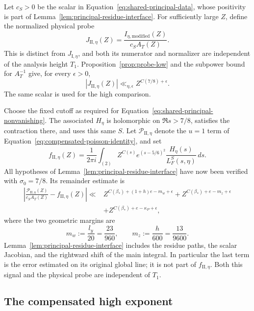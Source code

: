 \documentclass[11pt,a4paper]{article}
\numberwithin{equation}{section}
\numberwithin{figure}{section}
\theoremstyle{definition}
\theoremstyle{remark}
\begin{document}
Let \(c_S>0\) be the scalar in Equation~\eqref{eq:shared-principal-data},
whose positivity is part of Lemma~\ref{lem:principal-residue-interface}.
For sufficiently large \(Z\), define the normalized physical probe
\[
 J_{\mathrm{II},\eta}(Z)
   =\frac{I_{\eta,\mathrm{modified}}(Z)}{c_S A_T(Z)}.
\]
This is distinct from \(J_{\mathrm I,\eta}\), and both its numerator and
normalizer are independent of the analysis height \(T_1\).
Proposition~\ref{prop:probe-low} and the subpower bound for \(A_T^{-1}\)
give, for every \(\epsilon>0\),
\begin{equation}\label{eq:part-II-normalized-low}
 |J_{\mathrm{II},\eta}(Z)|
 \ll_{\eta,\epsilon} Z^{C(7/8)+\epsilon}.
\end{equation}
The same scalar is used for the high comparison.

Choose the fixed cutoff as required for
Equation~\eqref{eq:shared-principal-nonvanishing}.  The associated
\(H_\eta\) is holomorphic on \(\Re s>7/8\), satisfies the contraction
there, and uses this same \(S\).  Let \(\mathscr P_{\mathrm{II},\eta}\)
denote the \(u=1\) term of Equation~\eqref{eq:compensated-poisson-identity},
and set
\[
 f_{\mathrm{II},\eta}(Z)=\frac1{2\pi i}\int_{(2)}
 Z^{C(s)}e^{(s-5/6)^2}\frac{H_\eta(s)}{L_F^S(s,\eta)}\,ds.
\]
All hypotheses of Lemma~\ref{lem:principal-residue-interface} have now
been verified with \(\sigma_0=7/8\).  Its remainder estimate is
\[
 \begin{split}
 \left|\frac{\mathscr P_{\mathrm{II},\eta}(Z)}{c_S A_T(Z)}
       -f_{\mathrm{II},\eta}(Z)\right|
 \ll{}&
 Z^{C(\beta_*)+(1+h)e-m_w+\epsilon}
 +Z^{C(\beta_*)+e-m_z+\epsilon}\\
 &+Z^{C(\beta_*)+e-\kappa_P+\epsilon},
 \end{split}
\]
where the two geometric margins are
\begin{equation}\label{old-eq:5.14}
 m_w:=\frac{l_y}{20}=\frac{23}{960},\qquad
 m_z:=\frac h{600}=\frac{13}{9600}.
\end{equation}
Lemma~\ref{lem:principal-residue-interface} includes the residue paths,
the scalar Jacobian, and
the rightward shift of the main integral.  In particular the last term
is the error estimated on its original global line; it is not part of
\(f_{\mathrm{II},\eta}\).  Both this signal and the physical probe are
independent of \(T_1\).

\subsection{The compensated high exponent}
\end{document}
